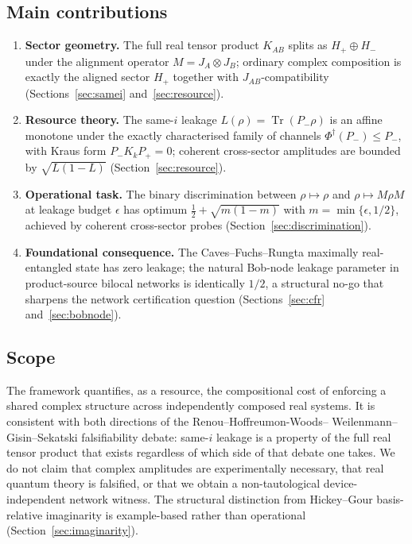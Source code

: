 \documentclass[a4paper,onecolumn,noarxiv]{quantumarticle}
\theoremstyle{plain}
\theoremstyle{definition}
\theoremstyle{remark}
\newcommand{\KAB}{K_{AB}}
\newcommand{\Pplus}{P_{+}}
\newcommand{\Pminus}{P_{-}}
\newcommand{\Hplus}{H_{+}}
\newcommand{\Hminus}{H_{-}}
\newcommand{\Mop}{M}
\newcommand{\JAB}{J_{AB}}
\newcommand{\Tr}{\operatorname{Tr}}
\newcommand{\Phid}{\Phi^{\dagger}}
\newcommand{\Lleak}{L}
\begin{document}
\subsection*{Main contributions}
\label{ssec:contributions}

\begin{enumerate}
\item \textbf{Sector geometry.} The full real tensor product $\KAB$ splits as
  $\Hplus\oplus\Hminus$ under the alignment operator $\Mop = J_A\otimes J_B$;
  ordinary complex composition is exactly the aligned sector $\Hplus$ together
  with $\JAB$-compatibility (Sections~\ref{sec:samei} and~\ref{sec:resource}).

\item \textbf{Resource theory.} The same-$i$ leakage $\Lleak(\rho)=\Tr(\Pminus\rho)$
  is an affine monotone under the exactly characterised family of channels
  $\Phid(\Pminus)\le\Pminus$, with Kraus form $\Pminus K_k\Pplus=0$; coherent
  cross-sector amplitudes are bounded by $\sqrt{\Lleak(1-\Lleak)}$
  (Section~\ref{sec:resource}).

\item \textbf{Operational task.} The binary discrimination between $\rho\mapsto\rho$
  and $\rho\mapsto\Mop\rho\Mop$ at leakage budget $\epsilon$ has optimum
  $\tfrac{1}{2}+\sqrt{m(1-m)}$ with $m=\min\{\epsilon,1/2\}$, achieved by
  coherent cross-sector probes (Section~\ref{sec:discrimination}).

\item \textbf{Foundational consequence.} The Caves--Fuchs--Rungta maximally
  real-entangled state has zero leakage; the natural Bob-node leakage parameter in
  product-source bilocal networks is identically $1/2$, a structural no-go that
  sharpens the network certification question
  (Sections~\ref{sec:cfr} and~\ref{sec:bobnode}).
\end{enumerate}

\subsection*{Scope}
\label{ssec:scope}

The framework quantifies, as a resource, the compositional cost of enforcing a
shared complex structure across independently composed real systems. It is
consistent with both directions of the Renou--Hoffreumon-Woods--%
Weilenmann--Gisin--Sekatski falsifiability debate: same-$i$ leakage is a property
of the full real tensor product that exists regardless of which side of that debate
one takes. We do not claim that complex amplitudes are experimentally necessary,
that real quantum theory is falsified, or that we obtain a non-tautological
device-independent network witness. The structural distinction from Hickey--Gour
basis-relative imaginarity is example-based rather than operational
(Section~\ref{sec:imaginarity}).
\end{document}
